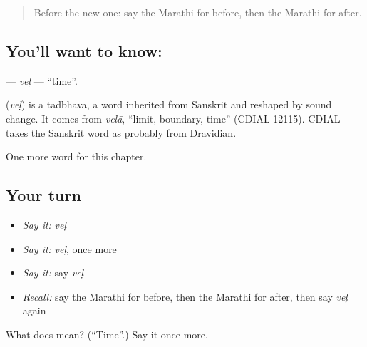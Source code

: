 \label{lesson:MR-C111-vel}



\begin{quote}
Before the new one: say the Marathi for before, then the Marathi for after.
\end{quote}

\subsection*{You'll want to know: }
\textbf{} — \emph{veḷ} — \textquotedblleft{}time\textquotedblright{}.

\begin{cousinweb}
\textbf{} (\emph{veḷ}) is a tadbhava, a word inherited from Sanskrit and reshaped by sound change. It comes from \emph{velā}, \textquotedblleft{}limit, boundary, time\textquotedblright{} (CDIAL 12115). CDIAL takes the Sanskrit word as probably from Dravidian.
\end{cousinweb}

\begin{grammarlens}[title={What you've built}]
One more word for this chapter.
\end{grammarlens}

\subsection*{Your turn}
\begin{itemize}
\raggedright
  \item \emph{Say it:} \emph{veḷ}
  \item \emph{Say it:} \emph{veḷ}, once more
  \item \emph{Say it:} say \emph{veḷ}
  \item \emph{Recall:} say the Marathi for before, then the Marathi for after, then say \emph{veḷ} again
\end{itemize}

\begin{tcolorbox}[breakable,colback=teal!4,colframe=teal!35!black,title={Before you move on}]
What does  mean? (\textquotedblleft{}Time\textquotedblright{}.) Say it once more.
\end{tcolorbox}
